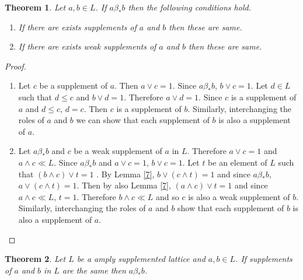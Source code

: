 \documentclass[a4paper,12pt]{article}
\newtheorem{theorem}{Theorem}[section]
\numberwithin{equation}{section}
\begin{document}
\begin{theorem}\label{8}
  Let $ a,b \in L $. If $ a\beta_* b $ then the following conditions hold.
  \begin{enumerate}[label=(\roman{*}), ref=(\roman{*})]
    \item
      If there are exists supplements of $ a $ and $ b $ then these are same. \label{8.1}
    \item
      If there are exists weak supplements of $ a $ and $ b $ then these are same. \label{8.2}
  \end{enumerate}
\end{theorem}
\begin{proof}
  \begin{enumerate}
    \item
      Let $ c $ be a supplement of $ a $. Then $ a \vee c = 1 $. Since $ a \beta_* b $, $ b \vee c=1 $.
      Let $ d \in L $ such that $ d \leq c $ and $ b \vee d = 1 $. Therefore 
      $ a \vee d = 1 $. Since $ c $ is a supplement of $ a $ and $ d \leq c $, $ d = c $. Then 
      $ c $ is a supplement of $ b $. Similarly, interchanging the roles of $ a $ and $ b $ 
      we can show that each supplement of $ b $ is also a supplement of $ a $.
    \item
      Let $ a \beta_* b $ and $ c $ be a weak supplement of $ a $ in $ L $. Therefore $ a \vee c = 1 $ 
      and $ a \wedge c \ll L $. Since $ a \beta_* b $ and $ a \vee c = 1 $, $ b \vee c = 1 $. 
      Let $ t $ be an element of $ L $ such that $ (b \wedge c ) \vee t = 1 $ . By Lemma \ref{7}, 
      $ b \vee ( c \wedge t )=1 $ and since $ a \beta_* b $, $ a \vee ( c \wedge t ) = 1 $. Then by also Lemma \ref{7}, $ ( a \wedge c ) \vee t = 1 $ and since $ a \wedge c \ll L $, $ t = 1 $.
      Therefore $ b \wedge c \ll L $ and so $ c $ is also a weak supplement of $ b $. 
      Similarly, interchanging the roles of $ a $ and $ b $ show that each supplement of $ b $ 
      is also a supplement of $ a $.
  \end{enumerate}
\end{proof}




\begin{theorem}\label{9}
  Let $ L $ be a amply supplemented lattice and $ a,b \in L $. If supplements of $ a $ and $ b $ in $ L $ 
  are the same then $ a \beta_* b $.
\end{theorem}
\end{document}
